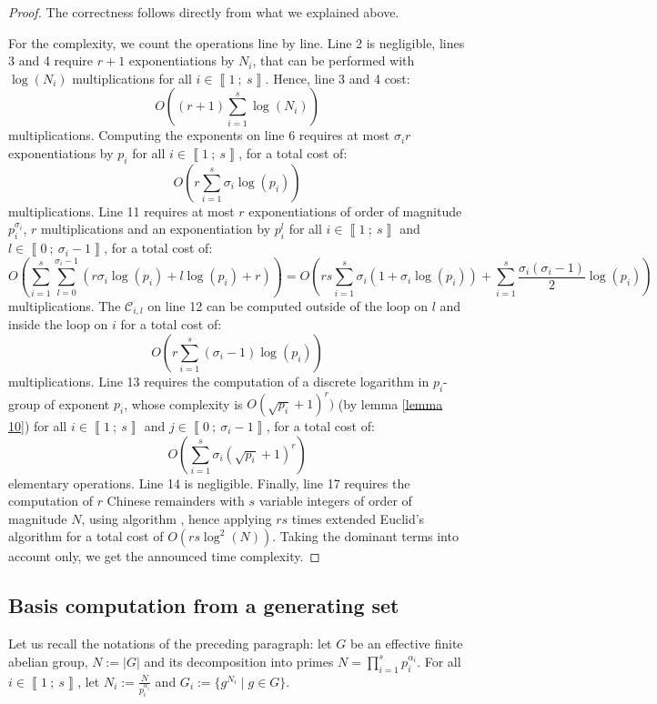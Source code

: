 \documentclass[a4paper,10pt]{report}
\theoremstyle{definition}
\theoremstyle{plain}
\theoremstyle{definition}
\newcommand{\m}[1]{\mathcal{#1}}
\renewcommand{\i}[2]{\left\llbracket #1~;~#2\right\rrbracket}
\renewcommand{\(}{\left(}
\renewcommand{\)}{\right)}
\begin{document}
\begin{proof}
The correctness follows directly from what we explained above. 

For the complexity, we count the operations line by line. Line 2 is negligible, lines 3 and 4 require $r+1$ exponentiations by $N_i$, that can be performed with $\log(N_i)$ multiplications for all $i\in\i{1}{s}$. Hence, line 3 and 4 cost:
\[O\((r+1)\sum_{i=1}^s \log(N_i)\)\] 
multiplications. Computing the exponents on line 6 requires at most $\sigma_i r$ exponentiations by $p_i$ for all $i\in\i{1}{s}$, for a total cost of:
\[O\(r\sum_{i=1}^s\sigma_i\log(p_i)\)\]
multiplications.  Line 11 requires at most $r$ exponentiations of order of magnitude $p_i^{\sigma_i}$, $r$ multiplications and an exponentiation by $p_i^{l}$ for all $i\in\i{1}{s}$ and $l\in\i{0}{\sigma_i-1}$, for a total cost of:
\[O\(\sum_{i=1}^s\sum_{l=0}^{\sigma_i-1}(r\sigma_i\log(p_i)+l\log(p_i)+r)\)=O\(rs\sum_{i=1}^s\sigma_i(1+\sigma_i\log(p_i))+\sum_{i=1}^s\frac{\sigma_i(\sigma_i-1)}{2}\log(p_i)\)\]
multiplications. The $\m{C}_{i,l}$ on line 12 can be computed outside of the loop on $l$ and inside the loop on $i$ for a total cost of:
\[O\(r\sum_{i=1}^s(\sigma_i-1)\log(p_i)\)\]
multiplications. Line 13 requires the computation of a discrete logarithm in $p_i$-group of exponent $p_i$, whose complexity is $O(\sqrt{p_i}+1)^r)$ (by lemma \ref{lemma 10}) for all $i\in\i{1}{s}$ and $j\in\i{0}{\sigma_i-1}$, for a total cost of:
\[O\(\sum_{i=1}^s\sigma_i(\sqrt{p_i}+1)^r\)\]
elementary operations. Line 14 is negligible. Finally, line 17 requires the computation of $r$ Chinese remainders with $s$ variable integers of order of magnitude $N$, using algorithm \cite[algorithm 1.3.12]{Cohen1}, hence applying $rs$ times extended Euclid's algorithm for a total cost of $O(rs\log^2(N))$. Taking the dominant terms into account only, we get the announced time complexity.
\end{proof}


\subsection{Basis computation from a generating set}

Let us recall the notations of the preceding paragraph: let $G$ be an effective finite abelian group, $N:=|G|$ and its decomposition into primes $N=\prod_{i=1}^s p_i^{\alpha_i}$. For  all $i\in\i{1}{s}$, let $N_i:=\frac{N}{p_i^{\alpha_i}}$ and $G_i:=\{g^{N_i}\mid g\in G\}$.
\end{document}
